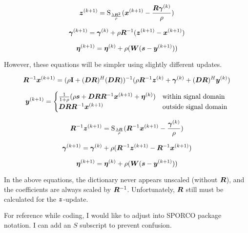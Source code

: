 \documentclass{article}
\begin{document}
\begin{equation}
\bm{z}^{(k + 1)}= \operatorname{S}_{\frac{\lambda\bm{R}^2}{\rho}}(\bm{x}^{(k+1)} - \frac{\bm{R}\bm{\gamma}^{(k)}}{\rho})
\end{equation}

\begin{equation}
\bm{\gamma}^{(k + 1)} = \bm{\gamma}^{(k)} + \rho\bm{R}^{-1}(\bm{z}^{(k + 1)} - \bm{x}^{(k + 1)})
\end{equation}

\begin{equation}
\bm{\eta}^{(k + 1)} = \bm{\eta}^{(k)} + \rho(\bm{W}(\bm{s} - \bm{y}^{(k + 1)}))
\end{equation}

However, these equations will be simpler using slightly different updates.

\begin{equation}
\bm{R}^{-1}\bm{x}^{(k + 1)} = (\rho{\bf I} + (\bm{D}\bm{R})^H(\bm{D}\bm{R}))^{-1}(\rho\bm{R}^{-1}\bm{z}^{(k)} + \bm{\gamma}^{(k)} + (\bm{D}\bm{R})^H\bm{y}^{(k)})
\end{equation}

\begin{equation}
\bm{y}^{(k + 1)}= \begin{cases}
\frac{1}{1 + \rho}(\rho\bm{s} + \bm{D}\bm{R}\bm{R}^{-1}\bm{x}^{(k + 1)} + \bm{\eta}^{(k)}) & \text{within signal domain}\\
\bm{D}\bm{R}\bm{R}^{-1}\bm{x}^{(k + 1)} & \text{outside signal domain}
\end{cases}
\end{equation}

\begin{equation}
\bm{R}^{-1}\bm{z}^{(k + 1)}= \operatorname{S}_{\frac{\lambda\bm{R}}{\rho}}(\bm{R}^{-1}\bm{x}^{(k+1)} - \frac{\bm{\gamma}^{(k)}}{\rho})
\end{equation}

\begin{equation}
\bm{\gamma}^{(k + 1)} = \bm{\gamma}^{(k)} + \rho(\bm{R}^{-1}\bm{z}^{(k + 1)} - \bm{R}^{-1}\bm{x}^{(k + 1)})
\end{equation}

\begin{equation}
\bm{\eta}^{(k + 1)} = \bm{\eta}^{(k)} + \rho(\bm{W}(\bm{s} - \bm{y}^{(k + 1)}))
\end{equation}


In the above equations, the dictionary never appears unscaled (without $\bm{R}$), and the coefficients are always scaled by $\bm{R}^{-1}$. Unfortunately,  $\bm{R}$ still must be calculated for the $\bm{z}$-update.

For reference while coding, I would like to adjust into SPORCO package notation. I can add an $S$ subscript to prevent confusion.
\end{document}
